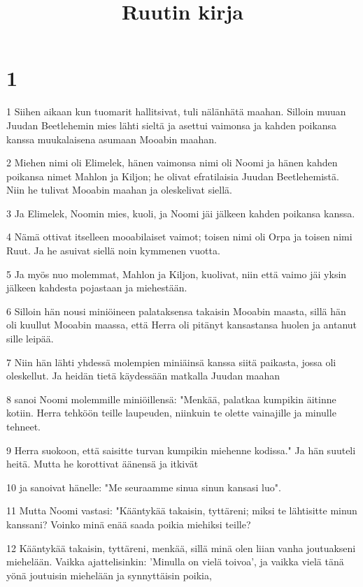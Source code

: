

\title{Ruutin kirja}


\chapter{1}

\par 1 Siihen aikaan kun tuomarit hallitsivat, tuli nälänhätä maahan. Silloin muuan Juudan Beetlehemin mies lähti sieltä ja asettui vaimonsa ja kahden poikansa kanssa muukalaisena asumaan Mooabin maahan.
\par 2 Miehen nimi oli Elimelek, hänen vaimonsa nimi oli Noomi ja hänen kahden poikansa nimet Mahlon ja Kiljon; he olivat efratilaisia Juudan Beetlehemistä. Niin he tulivat Mooabin maahan ja oleskelivat siellä.
\par 3 Ja Elimelek, Noomin mies, kuoli, ja Noomi jäi jälkeen kahden poikansa kanssa.
\par 4 Nämä ottivat itselleen mooabilaiset vaimot; toisen nimi oli Orpa ja toisen nimi Ruut. Ja he asuivat siellä noin kymmenen vuotta.
\par 5 Ja myös nuo molemmat, Mahlon ja Kiljon, kuolivat, niin että vaimo jäi yksin jälkeen kahdesta pojastaan ja miehestään.
\par 6 Silloin hän nousi miniöineen palataksensa takaisin Mooabin maasta, sillä hän oli kuullut Mooabin maassa, että Herra oli pitänyt kansastansa huolen ja antanut sille leipää.
\par 7 Niin hän lähti yhdessä molempien miniäinsä kanssa siitä paikasta, jossa oli oleskellut. Ja heidän tietä käydessään matkalla Juudan maahan
\par 8 sanoi Noomi molemmille miniöillensä: "Menkää, palatkaa kumpikin äitinne kotiin. Herra tehköön teille laupeuden, niinkuin te olette vainajille ja minulle tehneet.
\par 9 Herra suokoon, että saisitte turvan kumpikin miehenne kodissa." Ja hän suuteli heitä. Mutta he korottivat äänensä ja itkivät
\par 10 ja sanoivat hänelle: "Me seuraamme sinua sinun kansasi luo".
\par 11 Mutta Noomi vastasi: "Kääntykää takaisin, tyttäreni; miksi te lähtisitte minun kanssani? Voinko minä enää saada poikia miehiksi teille?
\par 12 Kääntykää takaisin, tyttäreni, menkää, sillä minä olen liian vanha joutuakseni miehelään. Vaikka ajattelisinkin: 'Minulla on vielä toivoa', ja vaikka vielä tänä yönä joutuisin miehelään ja synnyttäisin poikia,
